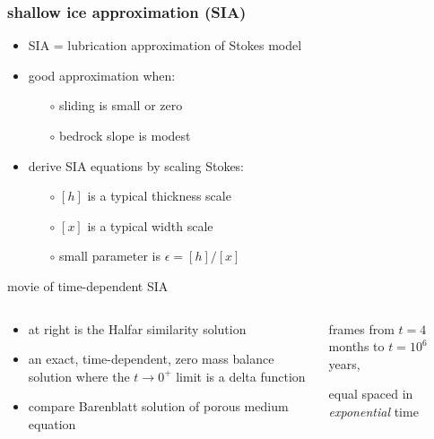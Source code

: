 \documentclass{beamer}
\newcommand{\eps}{\epsilon}
\begin{document}
\begin{frame}
  \frametitle{shallow ice approximation (SIA)}

\begin{itemize}
\item SIA = lubrication approximation of Stokes model
\item good approximation when:
  \begin{itemize}
  \item[$\circ$] sliding is small or zero
  \item[$\circ$] bedrock slope is modest
  \end{itemize}
\item derive SIA equations by scaling Stokes:
  \begin{itemize}
  \item[$\circ$] $[h]$ is a typical thickness scale
  \item[$\circ$] $[x]$ is a typical width scale
  \item[$\circ$] small parameter is $\eps = [h] / [x]$
  \end{itemize}
\end{itemize}
\end{frame}


\begin{frame}{movie of time-dependent SIA}

\begin{columns}
\begin{column}{0.4\textwidth}
\small
\begin{itemize}
\item at right is the Halfar similarity solution
\item an exact, time-dependent, zero mass balance solution where the $t\to 0^+$ limit is a delta function
\item compare Barenblatt solution of porous medium equation
\end{itemize}
\end{column}

\begin{column}{0.65\textwidth}
\vspace{-0.25in}

\begin{center}

\bigskip
\tiny
frames from $t=4$ months to $t = 10^6$ years,

equal spaced in \emph{exponential} time
\end{center}
\end{column}
\end{columns}
\end{frame}
\end{document}
